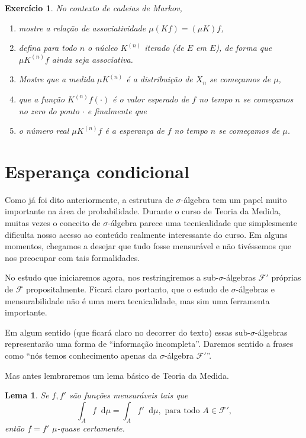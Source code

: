 \documentclass[reqno]{article}
\newcommand*\1{\mathds{1}}
\newtheorem{lemma}[theorem]{Lema}
\newtheorem{exercise}[example]{Exercício}
\renewcommand*\d{\mathop{}\!\mathrm{d}}
\begin{document}
\begin{exercise}
  No contexto de cadeias de Markov,
  \begin{enumerate}[\quad a)]
  \item mostre a relação de associatividade $\mu (K f) = (\mu K) f$,
  \item defina para todo $n$ o núcleo $K^{(n)}$ iterado (de $E$ em $E$), de forma que $\mu K^{(n)} f$ ainda seja associativa.
  \item Mostre que a medida $\mu K^{(n)}$ é a distribuição de $X_n$ se começamos de $\mu$,
  \item que a função $K^{(n)} f (\cdot)$ é o valor esperado de $f$ no tempo $n$ se começamos no zero do ponto $\cdot$ e finalmente que
  \item o número real $\mu K^{(n)} f$ é a esperança de $f$ no tempo $n$ se começamos de $\mu$.
  \end{enumerate}
\end{exercise}

\newpage

\section{Esperança condicional}

Como já foi dito anteriormente, a estrutura de $\sigma$-álgebra tem um papel muito importante na área de probabilidade.
Durante o curso de Teoria da Medida, muitas vezes o conceito de $\sigma$-álgebra parece uma tecnicalidade que simplesmente dificulta nosso acesso ao conteúdo realmente interessante do curso.
Em alguns momentos, chegamos a desejar que tudo fosse mensurável e não tivéssemos que nos preocupar com tais formalidades.

No estudo que iniciaremos agora, nos restringiremos a sub-$\sigma$-álgebras $\mathcal{F}'$ próprias de $\mathcal{F}$ propositalmente.
Ficará claro portanto, que o estudo de $\sigma$-álgebras e mensurabilidade não é uma mera tecnicalidade, mas sim uma ferramenta importante.

Em algum sentido (que ficará claro no decorrer do texto) essas sub-$\sigma$-álgebras representarão uma forma de ``informação incompleta''.
Daremos sentido a frases como ``nós temos conhecimento apenas da $\sigma$-álgebra $\mathcal{F}'$''.

Mas antes lembraremos um lema básico de Teoria da Medida.

\begin{lemma}
  \label{l:f_igual_fp}
  Se $f, f'$ são funções mensuráveis tais que
  \begin{equation}
    \int_A f \d \mu = \int_A f' \d \mu, \text{ para todo $A \in \mathcal{F}'$,}
  \end{equation}
  então $f = f'$ $\mu$-quase certamente.
\end{lemma}
\end{document}
